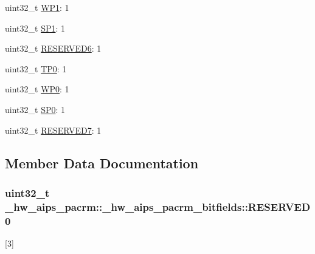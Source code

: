\begin{DoxyCompactItemize}
\item 
uint32\+\_\+t \hyperlink{struct__hw__aips__pacrm_1_1__hw__aips__pacrm__bitfields_addc5d5b30cc35c207d98082d83d350e5}{W\+P1}\+: 1
\item 
uint32\+\_\+t \hyperlink{struct__hw__aips__pacrm_1_1__hw__aips__pacrm__bitfields_a36efbcfdca2cba5ad098dde886db7f3a}{S\+P1}\+: 1
\item 
uint32\+\_\+t \hyperlink{struct__hw__aips__pacrm_1_1__hw__aips__pacrm__bitfields_a24d712696d89ee882d385a9ee72e519d}{R\+E\+S\+E\+R\+V\+E\+D6}\+: 1
\item 
uint32\+\_\+t \hyperlink{struct__hw__aips__pacrm_1_1__hw__aips__pacrm__bitfields_a0d62acde9d6bbb6613caf95beed55e4a}{T\+P0}\+: 1
\item 
uint32\+\_\+t \hyperlink{struct__hw__aips__pacrm_1_1__hw__aips__pacrm__bitfields_a57f9e7d4e8c397b005cd4b5237d80558}{W\+P0}\+: 1
\item 
uint32\+\_\+t \hyperlink{struct__hw__aips__pacrm_1_1__hw__aips__pacrm__bitfields_a7bdddb281f8295ea761706f85f14580a}{S\+P0}\+: 1
\item 
uint32\+\_\+t \hyperlink{struct__hw__aips__pacrm_1_1__hw__aips__pacrm__bitfields_a7c3b11dfed2a21c9cb91cfacecf759e1}{R\+E\+S\+E\+R\+V\+E\+D7}\+: 1
\end{DoxyCompactItemize}


\subsection{Member Data Documentation}
\subsubsection[{\texorpdfstring{R\+E\+S\+E\+R\+V\+E\+D0}{RESERVED0}}]{\setlength{\rightskip}{0pt plus 5cm}uint32\+\_\+t \+\_\+hw\+\_\+aips\+\_\+pacrm\+::\+\_\+hw\+\_\+aips\+\_\+pacrm\+\_\+bitfields\+::\+R\+E\+S\+E\+R\+V\+E\+D0}\hypertarget{struct__hw__aips__pacrm_1_1__hw__aips__pacrm__bitfields_a2eb7e6d557ef8812cb8c4e2155122719}{}\label{struct__hw__aips__pacrm_1_1__hw__aips__pacrm__bitfields_a2eb7e6d557ef8812cb8c4e2155122719}
\mbox{[}3\mbox{]} 
